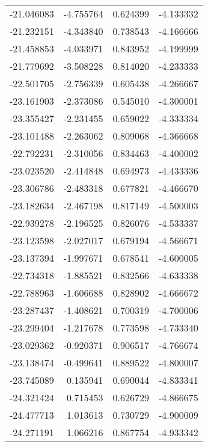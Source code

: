 \begin{tabular}{rrrr}
      -21.046083 &        -4.755764 &    0.624399 &  -4.133332 \\
      -21.232151 &        -4.343840 &    0.738543 &  -4.166666 \\
      -21.458853 &        -4.033971 &    0.843952 &  -4.199999 \\
      -21.779692 &        -3.508228 &    0.814020 &  -4.233333 \\
      -22.501705 &        -2.756339 &    0.605438 &  -4.266667 \\
      -23.161903 &        -2.373086 &    0.545010 &  -4.300001 \\
      -23.355427 &        -2.231455 &    0.659022 &  -4.333334 \\
      -23.101488 &        -2.263062 &    0.809068 &  -4.366668 \\
      -22.792231 &        -2.310056 &    0.834463 &  -4.400002 \\
      -23.023520 &        -2.414848 &    0.694973 &  -4.433336 \\
      -23.306786 &        -2.483318 &    0.677821 &  -4.466670 \\
      -23.182634 &        -2.467198 &    0.817149 &  -4.500003 \\
      -22.939278 &        -2.196525 &    0.826076 &  -4.533337 \\
      -23.123598 &        -2.027017 &    0.679194 &  -4.566671 \\
      -23.137394 &        -1.997671 &    0.678541 &  -4.600005 \\
      -22.734318 &        -1.885521 &    0.832566 &  -4.633338 \\
      -22.788963 &        -1.606688 &    0.828902 &  -4.666672 \\
      -23.287437 &        -1.408621 &    0.700319 &  -4.700006 \\
      -23.299404 &        -1.217678 &    0.773598 &  -4.733340 \\
      -23.029362 &        -0.920371 &    0.906517 &  -4.766674 \\
      -23.138474 &        -0.499641 &    0.889522 &  -4.800007 \\
      -23.745089 &         0.135941 &    0.690044 &  -4.833341 \\
      -24.321424 &         0.715453 &    0.626729 &  -4.866675 \\
      -24.477713 &         1.013613 &    0.730729 &  -4.900009 \\
      -24.271191 &         1.066216 &    0.867754 &  -4.933342 \\

\end{tabular}
